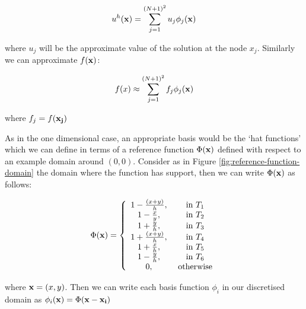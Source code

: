 \begin{equation}
    u^h(\mathbf{x}) = \sum_{j=1}^{(N+1)^2}u_j\phi_j(\mathbf{x})
\end{equation}

where $u_j$ will be the approximate value of the solution at the node $x_j$.
Similarly we can approximate $f(\mathbf{x})$:

\begin{equation}
    f(x) \approx \sum_{j=1}^{(N+1)^2}f_j\phi_j(\mathbf{x})
\end{equation}

where $f_j = f(\mathbf{x_j})$


As in the one dimensional case, an appropriate basis would be the `hat
functions' which we can define in terms of a reference function $\Phi(\mathbf{x})$
defined with respect to an example domain around $(0,0)$.  Consider as in
Figure \ref{fig:reference-function-domain} the domain where the function has
support, then we can write $\Phi(\mathbf{x})$ as follows:

\begin{equation}\label{eq:two-d-ref-basis-fn}
    \Phi(\mathbf{x}) = \left\{\begin{array}{c c}
                    1 - \frac{(x + y)}{h}, & \text{ in } T_1 \\
                    1 - \frac{x}{y},       & \text{ in } T_2 \\
                    1 + \frac{y}{h},       & \text{ in } T_3 \\
                    1 + \frac{(x + y)}{h}, & \text{ in } T_4 \\
                    1 + \frac{x}{h},       & \text{ in } T_5 \\
                    1 - \frac{y}{h},       & \text{ in } T_6 \\
                    0,                     & \text{ otherwise}
                  \end{array}\right.
\end{equation}

where $\mathbf{x} = (x, y)$. Then we can write each basis function $\phi_i$ in our
discretised domain as $\phi_i(\mathbf{x}) = \Phi(\mathbf{x} - \mathbf{x_i})$

